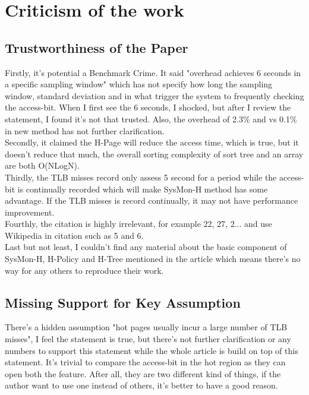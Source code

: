 \documentclass{article}
\begin{document}
\section{Criticism of the work}

\subsection{Trustworthiness of the Paper}

Firstly, it's potential a Benchmark Crime. It said "overhead achieves 6 seconds in a specific sampling window" which has not specify how long the sampling window, standard deviation and in what trigger the system to frequently checking the access-bit. When I first see the 6 seconds, I shocked, but after I review the statement, I found it's not that trusted. Also, the overhead of 2.3\% and vs 0.1\% in new method has not further clarification. \\
Secondly, it claimed the H-Page will reduce the access time, which is true, but it doesn't reduce that much, the overall sorting complexity of sort tree and an array are both O(NLogN). \\
Thirdly, the TLB misses record only assess 5 second for a period while the access-bit is continually recorded which will make SysMon-H method has some advantage. If  the TLB misses is record continually, it may not have performance improvement. \\
Fourthly, the citation is highly irrelevant, for example 22, 27, 2... and use Wikipedia in citation such as 5 and 6. \\
Last but not least, I couldn't find any material about the basic component of SysMon-H, H-Policy and H-Tree mentioned in the article which means there's no way for any others to reproduce their work. 

\subsection{Missing Support for Key Assumption}

There's a hidden assumption "hot pages usually incur a large number of TLB misses", I feel the statement is true, but there's not further clarification or any numbers to support this statement while the whole article is build on top of this statement. It's trivial to compare the access-bit in the hot region as they can open both the feature. After all, they are two different kind of things, if the author want to use one instead of others, it's better to have a good reason.
\end{document}
